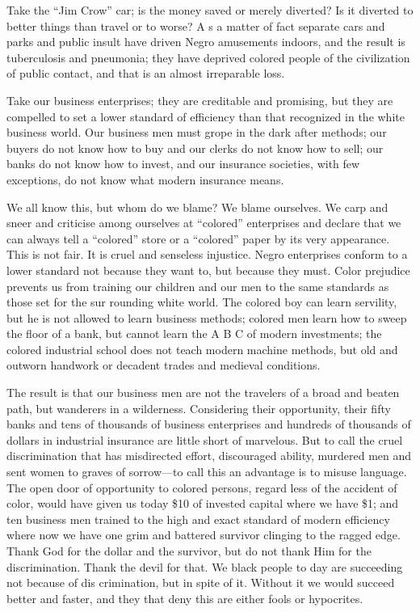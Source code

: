 \documentclass[letterpaper,10pt,english]{jupyterBook}
\begin{document}
\sphinxAtStartPar
Take the “Jim Crow” car; is the money saved or merely diverted? Is it diverted to better things than travel or to worse? A s a matter of fact separate cars and parks and public insult have driven Negro amusements indoors, and the result is tuberculosis and pneumonia; they have deprived colored people of the civilization of public contact, and that is an almost irreparable loss.

\sphinxAtStartPar
Take our business enterprises; they are creditable and promising, but they are compelled to set a lower standard of efficiency than that recognized in the white business world. Our business men must grope in the dark after methods; our buyers do not know how to buy and our clerks do not know how to sell; our banks do not know how to invest, and our insurance societies, with few exceptions, do not know what modern insurance means.

\sphinxAtStartPar
We all know this, but whom do we blame? We blame ourselves. We carp and sneer and criticise among ourselves at “colored” enterprises and declare that we can always tell a “colored” store or a “colored” paper by its very appearance. This is not fair. It is cruel and senseless injustice. Negro enterprises conform to a lower standard not because they want to, but because they must. Color prejudice prevents us from training our children and our men to the same standards as those set for the sur­ rounding white world. The colored boy can learn servility, but he is not allowed to learn business methods; colored men learn how to sweep the floor of a bank, but cannot learn the A B C of modern investments; the colored industrial school does not teach modern machine methods, but old and outworn handwork or decadent trades and medieval conditions.

\sphinxAtStartPar
The result is that our business men are not the travelers of a broad and beaten path, but wanderers in a wilderness. Considering their opportunity, their fifty banks and tens of thousands of business enterprises and hundreds of thousands of dollars in industrial insurance are little short of marvelous. But to call the cruel discrimination that has misdirected effort, discouraged ability, murdered men and sent women to graves of sorrow—to call this an advantage is to misuse language. The open door of opportunity to colored persons, regard­ less of the accident of color, would have given us to\sphinxhyphen{}day \$10 of invested capital where we have \$1; and ten business men trained to the high and exact standard of modern efficiency where now we have one grim and battered survivor clinging to the ragged edge. Thank God for the dollar and the survivor, but do not thank Him for the discrimination. Thank the devil for that. We black people to­ day are succeeding not because of dis­ crimination, but in spite of it. Without it we would succeed better and faster, and they that deny this are either fools or hypocrites.
\end{document}
